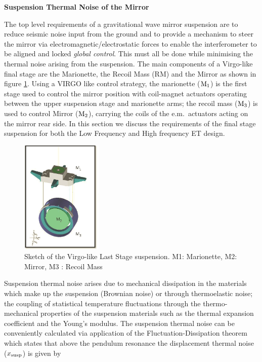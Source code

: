 \label{sec:suspension}


{\bf Suspension Thermal Noise of the Mirror}
\label{sec:last_stage}

The top level requirements of a gravitational wave mirror suspension are to reduce seismic noise input from the ground and to provide a mechanism to steer the mirror via electromagnetic/electrostatic forces to enable the interferometer to be aligned and locked \emph{global control}. This must all be done while minimising the thermal noise arising from the suspension. The main components of a Virgo-like final stage are the Marionette, the Recoil Mass (RM)  and the Mirror as shown in figure \ref{LSS}. Using a VIRGO like control strategy, the marionette  ($\rm M_1$) is the first stage used to control the mirror position with coil-magnet actuators operating between the upper suspension stage and marionette arms; the recoil mass ($\rm M_3$)  is used to control Mirror ($\rm M_2$), carrying the coils of the e.m.\ actuators acting on the mirror rear side. In this section we discuss the requirements of the final stage suspension for both the Low Frequency and High frequency ET design.
\begin{figure}
    \centering
    \includegraphics[width=0.35\textwidth]{./Detector/SASandSUS/SuspensionSystems/Suspension_Figures/TM_RM_M_suspension.png}
\caption{Sketch of the Virgo-like Last Stage suspension. M1:
Marionette, M2: Mirror, M3 : Recoil Mass}
    \label{LSS}
\end{figure}
Suspension thermal noise arises due to mechanical dissipation in the materials which make up the suspension (Brownian noise) or through thermoelastic noise; the coupling of statistical temperature fluctuations through the thermo-mechanical properties of the suspension materials such as the thermal expansion coefficient and the Young's modulus. The suspension thermal noise can be conveniently calculated via application of the Fluctuation-Dissipation theorem \cite{Callen:1951} which states that above the pendulum resonance the displacement thermal noise ($x_{\rm susp}$) is given by
